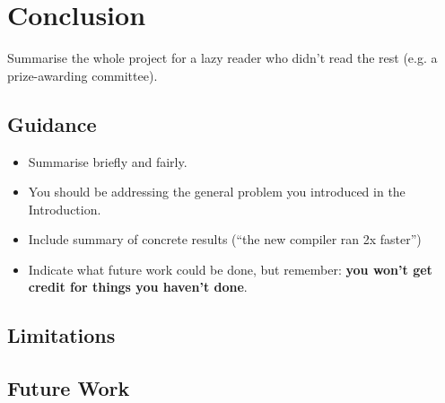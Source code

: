 \documentclass{l4proj}
\theoremstyle{definition}
\begin{document}





\chapter{Conclusion}    
Summarise the whole project for a lazy reader who didn't read the rest (e.g. a prize-awarding committee).
\section{Guidance}
\begin{itemize}
    \item
        Summarise briefly and fairly.
    \item
        You should be addressing the general problem you introduced in the
        Introduction.        
    \item
        Include summary of concrete results (``the new compiler ran 2x
        faster'')
    \item
        Indicate what future work could be done, but remember: \textbf{you
        won't get credit for things you haven't done}.
\end{itemize}

\section{Limitations}

\section{Future Work}
\end{document}
